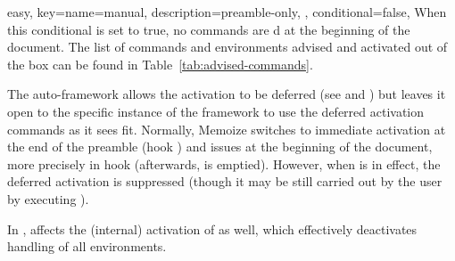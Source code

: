 \documentclass[a4paper,11pt]{article}
\begin{document}
\begin{doc}{easy,
    key={name=manual, description={preamble-only,{ }}, conditional=false},
  }
  When this conditional is set to true, no commands are d at
  the beginning of the document.  The list of commands and environments advised
  and activated out of the box can be found in Table~\ref{tab:advised-commands}.

  The auto-framework allows the activation to be deferred (see
   and ) but leaves it
  open to the specific instance of the framework to use the deferred activation
  commands as it sees fit.  Normally, Memoize switches to immediate activation
  at the end of the preamble (hook ) and issues
   at the beginning of the document, more precisely
  in hook  (afterwards,  is
  emptied).  However, when  is in effect, the deferred
  activation is suppressed (though it may be still carried out by the user by
  executing ).

  In ,  affects the (internal) activation of
   as well, which effectively deactivates handling of all environments.
\end{doc}
\end{document}
